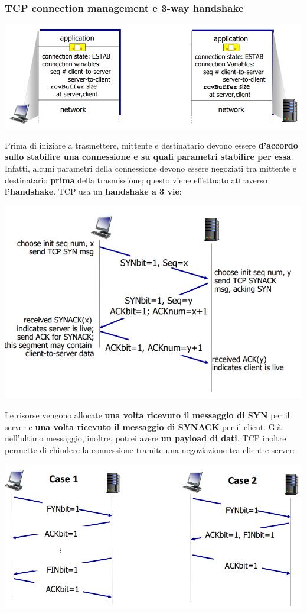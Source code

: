 \documentclass[12pt]{article}
\begin{document}
\subsubsection{TCP connection management e 3-way handshake}
\begin{center}
    \includegraphics[width = 0.95\linewidth]{Images/61.png}
\end{center}
Prima di iniziare a trasmettere, mittente e destinatario devono essere \textbf{d'accordo sullo stabilire una connessione e su quali parametri stabilire per essa}.
Infatti, alcuni parametri della connessione devono essere negoziati tra mittente e destinatario \textbf{prima} della trasmissione; questo viene effettuato attraverso 
\textbf{l'handshake}. TCP usa un \textbf{handshake a 3 vie}:
\begin{center}
    \includegraphics[width = 0.85\linewidth]{Images/62.png}
\end{center}
Le risorse vengono allocate \textbf{una volta ricevuto il messaggio di SYN} per il server e \textbf{una volta ricevuto il messaggio di SYNACK} per il client.
Già nell'ultimo messaggio, inoltre, potrei avere \textbf{un payload di dati}. TCP inoltre permette di chiudere la connessione tramite una negoziazione tra client e server:
\begin{center}
    \includegraphics[width = 0.85\linewidth]{Images/63.png}
\end{center}
\end{document}
